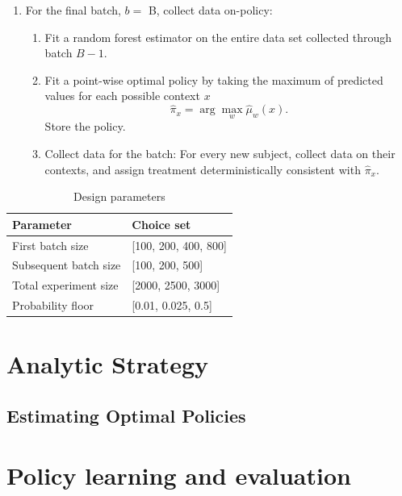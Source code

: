 \documentclass[letterpaper, 12pt, parskip=full,DIV=12]{scrartcl}
\begin{document}
\begin{enumerate}
\item For the final batch,  $b = $ B, collect data on-policy:
\begin{enumerate}
  \item Fit a random forest estimator on the entire data set collected through batch $B-1$.
  \item Fit a point-wise optimal policy  by taking the maximum of predicted values for each possible context $x$ 
    \begin{equation*}
     \hat{\pi}_{x} = \arg\max_{ w } \hat{\mu}_{w}(x) . 
    \end{equation*} 
  Store the policy. 
  \item Collect data for the batch: For every new subject, collect data on their contexts, and assign treatment deterministically consistent with $\hat{\pi}_{x}$. 
\end{enumerate}
\end{enumerate}


\begin{table}[H]
\centering
\caption{Design parameters}
\label{tab:design}
\begin{tabular}{l | l}
\textbf{Parameter} & \textbf{Choice set} \\ \hline
First batch size & [100, 200, 400, 800] \\
Subsequent batch size & [100, 200, 500] \\
Total experiment size & [2000, 2500, 3000] \\
Probability floor & [0.01, 0.025, 0.5]\\
\hline
\end{tabular}
\end{table}

\section{Analytic Strategy}

\subsection{Estimating Optimal Policies}



\section{Policy learning and evaluation}
\end{document}
